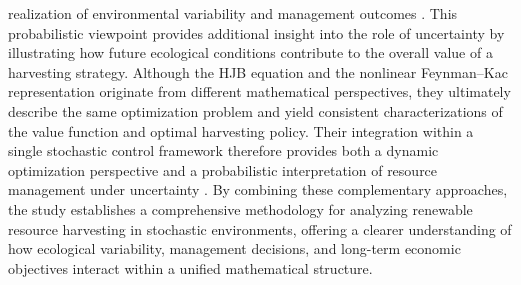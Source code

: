 \documentclass[11pt]{article}
\begin{document}
realization of environmental variability and management outcomes \citep{pramanik2024analysis,dunbar2026modeling}. This probabilistic viewpoint provides additional insight into the role of uncertainty by illustrating how future ecological conditions contribute to the overall value of a harvesting strategy. Although the HJB equation and the nonlinear Feynman--Kac representation originate from different mathematical perspectives, they ultimately describe the same optimization problem and yield consistent characterizations of the value function and optimal harvesting policy. Their integration within a single stochastic control framework therefore provides both a dynamic optimization perspective and a probabilistic interpretation of resource management under uncertainty \citep{dasgupta2026frequent}. By combining these complementary approaches, the study establishes a comprehensive methodology for analyzing renewable resource harvesting in stochastic environments, offering a clearer understanding of how ecological variability, management decisions, and long-term economic objectives interact within a unified mathematical structure.
	
\end{document}

